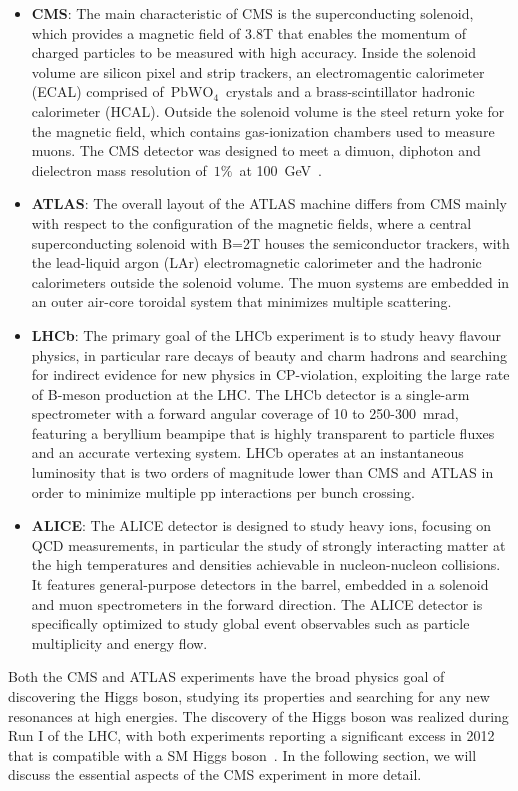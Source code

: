 \begin{itemize}
    \item \textbf{CMS}: The main characteristic of CMS is the superconducting solenoid, which provides a magnetic field of 3.8T that enables the momentum of charged particles to be measured with high accuracy. Inside the solenoid volume are silicon pixel and strip trackers, an electromagentic calorimeter (ECAL) comprised of~$\mathrm{PbWO}_4$~crystals and a brass-scintillator hadronic calorimeter (HCAL). Outside the solenoid volume is the steel return yoke for the magnetic field, which contains gas-ionization chambers used to measure muons. The CMS detector was designed to meet a dimuon, diphoton and dielectron mass resolution of~$1\%$~at 100~GeV~\cite{Chatrchyan:2008aa}.
    \item \textbf{ATLAS}: The overall layout of the ATLAS machine differs from CMS mainly with respect to the configuration of the magnetic fields, where a central superconducting solenoid with B=2T houses the semiconductor trackers, with the lead-liquid argon (LAr) electromagnetic calorimeter and the hadronic calorimeters outside the solenoid volume. The muon systems are embedded in an outer air-core toroidal system that minimizes multiple scattering.
    \item \textbf{LHCb}: The primary goal of the LHCb experiment is to study heavy flavour physics, in particular rare decays of beauty and charm hadrons and searching for indirect evidence for new physics in CP-violation, exploiting the large rate of B-meson production at the LHC. The LHCb detector is a single-arm spectrometer with a forward angular coverage of 10 to 250-300~mrad, featuring a beryllium beampipe that is highly transparent to particle fluxes and an accurate vertexing system. LHCb operates at an instantaneous luminosity that is two orders of magnitude lower than CMS and ATLAS in order to minimize multiple pp interactions per bunch crossing.
    \item \textbf{ALICE}: The ALICE detector is designed to study heavy ions, focusing on QCD measurements, in particular the study of strongly interacting matter at the high temperatures and densities achievable in nucleon-nucleon collisions. It features general-purpose detectors in the barrel, embedded in a solenoid and muon spectrometers in the forward direction. The ALICE detector is specifically optimized to study global event observables such as particle multiplicity and energy flow. 
\end{itemize}
Both the CMS and ATLAS experiments have the broad physics goal of discovering the Higgs boson, studying its properties and searching for any new resonances at high energies. The discovery of the Higgs boson was realized during Run I of the LHC, with both experiments reporting a significant excess in 2012 that is compatible with a SM Higgs boson~\cite{Aad:2012tfa,Chatrchyan:2012xdj}. In the following section, we will discuss the essential aspects of the CMS experiment in more detail.

